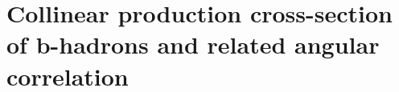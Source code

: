 \section{Collinear production cross-section of b-hadrons and related angular correlation}
\label{sec:collxsec}
